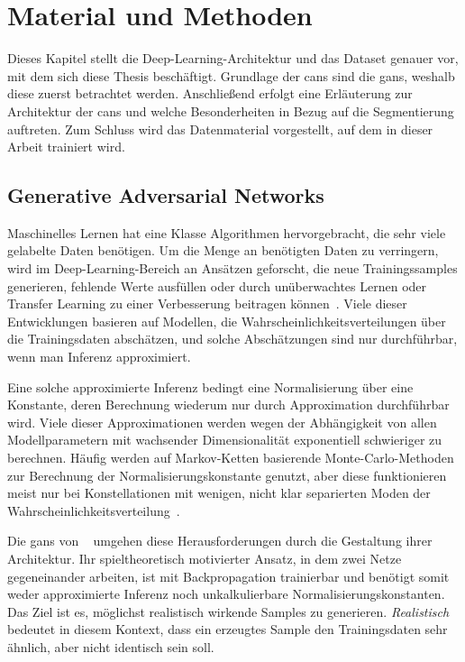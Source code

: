 \chapter{Material und Methoden}

Dieses Kapitel stellt die Deep-Learning-Architektur und das Dataset genauer vor, mit dem sich diese Thesis beschäftigt.
Grundlage der \glspl{can} sind die \glspl{gan}, weshalb diese zuerst betrachtet werden.
Anschließend erfolgt eine Erläuterung zur Architektur der \glspl{can} und welche Besonderheiten in Bezug auf die Segmentierung auftreten.
Zum Schluss wird das Datenmaterial vorgestellt, auf dem in dieser Arbeit trainiert wird.



\section{Generative Adversarial Networks}

Maschinelles Lernen hat eine Klasse Algorithmen hervorgebracht, die sehr viele gelabelte Daten benötigen.
Um die Menge an benötigten Daten zu verringern, wird im Deep-Learning-Bereich an Ansätzen geforscht, die neue Trainingssamples generieren, fehlende Werte ausfüllen oder durch unüberwachtes Lernen oder Transfer Learning zu einer Verbesserung beitragen können~\cite{Goodfellow.2016}.
Viele dieser Entwicklungen basieren auf Modellen, die Wahrscheinlichkeitsverteilungen über die Trainingsdaten abschätzen, und solche Abschätzungen sind nur durchführbar, wenn man Inferenz approximiert.

Eine solche approximierte Inferenz bedingt eine Normalisierung über eine Konstante, deren Berechnung wiederum nur durch Approximation durchführbar wird.
Viele dieser Approximationen werden wegen der Abhängigkeit von allen Modellparametern mit wachsender Dimensionalität exponentiell schwieriger zu berechnen.
Häufig werden auf Markov-Ketten basierende Monte-Carlo-Methoden~\cite{Koller.2009} zur Berechnung der Normalisierungskonstante genutzt, aber diese funktionieren meist nur bei Konstellationen mit wenigen, nicht klar separierten Moden der Wahrscheinlichkeitsverteilung~\cite{Goodfellow.2016}.

Die \glspl{gan} von \citeauthor{Goodfellow.2014}~\cite{Goodfellow.2014} umgehen diese Herausforderungen durch die Gestaltung ihrer Architektur.
Ihr spieltheoretisch motivierter Ansatz, in dem zwei Netze gegeneinander arbeiten, ist mit Backpropagation trainierbar und benötigt somit weder approximierte Inferenz noch unkalkulierbare Normalisierungskonstanten.
Das Ziel ist es, möglichst realistisch wirkende Samples zu generieren.
\emph{Realistisch} bedeutet in diesem Kontext, dass ein erzeugtes Sample den Trainingsdaten sehr ähnlich, aber nicht identisch sein soll.

